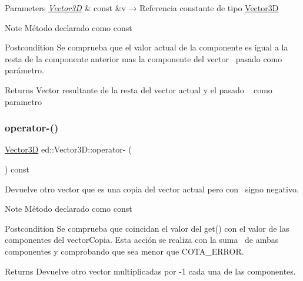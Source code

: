 \begin{DoxyParams}{Parameters}
{\em \mbox{\hyperlink{classed_1_1Vector3D}{Vector3D}}} & const \&v → Referencia constante de tipo \mbox{\hyperlink{classed_1_1Vector3D}{Vector3D}} \\
\hline
\end{DoxyParams}
\begin{DoxyNote}{Note}
Método declarado como const 
\end{DoxyNote}
\begin{DoxyPostcond}{Postcondition}
Se comprueba que el valor actual de la componente es igual a la~\newline
 resta de la componente anterior mas la componente del vector~\newline
 pasado como parámetro. 
\end{DoxyPostcond}
\begin{DoxyReturn}{Returns}
Vector resultante de la resta del vector actual y el pasado ~\newline
 como parametro 
\end{DoxyReturn}
\mbox{\label{classed_1_1Vector3D_aab00bcab59786a685b95fb12f8909e28}} 
\subsubsection{\texorpdfstring{operator-\/()}{operator-()}\hspace{0.1cm}{\footnotesize\ttfamily [2/2]}}
{\footnotesize\ttfamily \mbox{\hyperlink{classed_1_1Vector3D}{Vector3D}} ed\+::\+Vector3\+D\+::operator-\/ (\begin{DoxyParamCaption}{ }\end{DoxyParamCaption}) const}



Devuelve otro vector que es una copia del vector actual pero con~\newline
 signo negativo. 

\begin{DoxyNote}{Note}
Método declarado como const 
\end{DoxyNote}
\begin{DoxyPostcond}{Postcondition}
Se comprueba que coincidan el valor del get() con el valor de las~\newline
 componentes del vector\+Copia. Esta acción se realiza con la suma~\newline
 de ambas componentes y comprobando que sea menor que C\+O\+T\+A\+\_\+\+E\+R\+R\+OR. 
\end{DoxyPostcond}
\begin{DoxyReturn}{Returns}
Devuelve otro vector multiplicadas por -\/1 cada una de las componentes. 
\end{DoxyReturn}
\mbox{\label{classed_1_1Vector3D_afc9b1243cc26a4f20cf6e05f7e4dd8cc}} 
